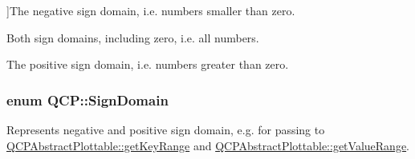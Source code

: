 \begin{Desc}
\begin{description}
{}]The negative sign domain, i.\+e. numbers smaller than zero. \item[{\em 
sd\+Both\hypertarget{namespace_q_c_p_afd50e7cf431af385614987d8553ff8a9a3dee7e9cd2fedce9253b83e172626a6c}{}\label{namespace_q_c_p_afd50e7cf431af385614987d8553ff8a9a3dee7e9cd2fedce9253b83e172626a6c}
}]Both sign domains, including zero, i.\+e. all numbers. \item[{\em 
sd\+Positive\hypertarget{namespace_q_c_p_afd50e7cf431af385614987d8553ff8a9a23362334a52289677a51526a9b68db6c}{}\label{namespace_q_c_p_afd50e7cf431af385614987d8553ff8a9a23362334a52289677a51526a9b68db6c}
}]The positive sign domain, i.\+e. numbers greater than zero. \end{description}
\end{Desc}
\subsubsection[{\texorpdfstring{Sign\+Domain}{SignDomain}}]{\setlength{\rightskip}{0pt plus 5cm}enum {\bf Q\+C\+P\+::\+Sign\+Domain}}\hypertarget{namespace_q_c_p_afd50e7cf431af385614987d8553ff8a9}{}\label{namespace_q_c_p_afd50e7cf431af385614987d8553ff8a9}
Represents negative and positive sign domain, e.\+g. for passing to \hyperlink{class_q_c_p_abstract_plottable_a4da16d3cd4b509e1104a9b0275623c96}{Q\+C\+P\+Abstract\+Plottable\+::get\+Key\+Range} and \hyperlink{class_q_c_p_abstract_plottable_a4de773988b21ed090fddd27c6a3a3dcb}{Q\+C\+P\+Abstract\+Plottable\+::get\+Value\+Range}.

